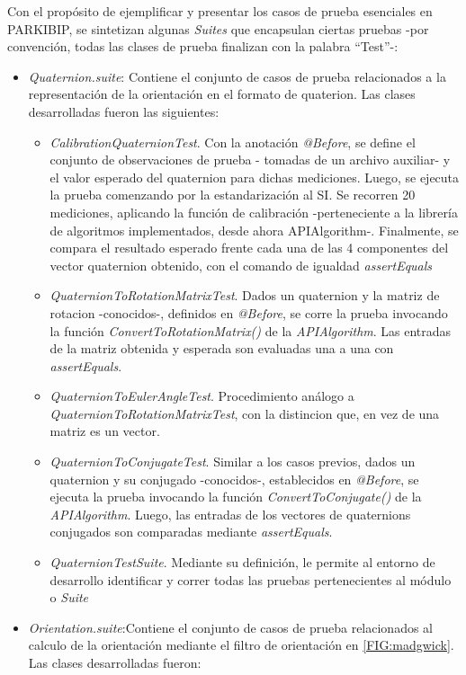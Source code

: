 \noindent Con el propósito de ejemplificar y presentar los casos de prueba esenciales en PARKIBIP, se sintetizan algunas \textit{Suites}  que encapsulan ciertas pruebas -por convención, todas las clases de prueba finalizan con la palabra ``Test''-:
\begin{itemize}
    \item \textit{Quaternion.suite}: Contiene el conjunto de casos de prueba relacionados a la representación de la orientación en el formato de quaterion. Las clases desarrolladas fueron las siguientes:
    \begin{itemize}
        \item \textit{CalibrationQuaternionTest}. Con la anotación \textit{@Before}, se define el conjunto de observaciones de prueba - tomadas de un archivo auxiliar- y el valor esperado del quaternion para dichas mediciones. Luego, se ejecuta la prueba comenzando por la estandarización al \gls{SI}. Se recorren 20 mediciones, aplicando la función de calibración -perteneciente a la librería de algoritmos implementados, desde ahora APIAlgorithm-. Finalmente, se compara el resultado esperado frente cada una de las 4 componentes del vector quaternion obtenido, con el comando de igualdad \textit{assertEquals}
        \item \textit{QuaternionToRotationMatrixTest}. Dados un quaternion y la matriz de rotacion -conocidos-, definidos en \textit{@Before}, se corre la prueba invocando la función \textit{ConvertToRotationMatrix()} de la \textit{APIAlgorithm}. Las entradas de la matriz obtenida y esperada son evaluadas una a una con \textit{assertEquals}.
        \item \textit{QuaternionToEulerAngleTest}. Procedimiento análogo a \textit{QuaternionToRotationMatrixTest}, con la distincion que, en vez de una matriz es un vector.
        \item \textit{QuaternionToConjugateTest}. Similar a los casos previos,  dados un quaternion y su conjugado -conocidos-, establecidos en \textit{@Before}, se ejecuta la prueba invocando la función \textit{ConvertToConjugate()} de la \textit{APIAlgorithm}. Luego, las entradas de los vectores de quaternions conjugados son comparadas mediante \textit{assertEquals}.
        \item \textit{QuaternionTestSuite}. Mediante su definición, le permite al entorno de desarrollo identificar y correr todas las pruebas pertenecientes al módulo o \textit{Suite}
    \end{itemize}
    \item \textit{Orientation.suite}:Contiene el conjunto de casos de prueba relacionados al calculo de la orientación mediante el filtro de orientación en \ref{FIG:madgwick}. Las clases desarrolladas fueron:

\end{itemize}
